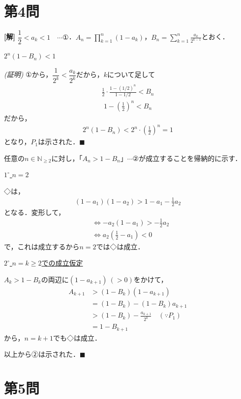 \documentclass[../main.tex]{subfiles}
\begin{document}
\newpage

\section*{第4問}

{\bf [解]}
$\dfrac12<a_k<1\quad\cdots①$．$A_n=\displaystyle\prod_{k=1}^n(1-a_k)$，$B_n=\displaystyle\sum_{k=1}^n\frac{a_k}{2^{k-1}}$とおく．

\bigskip
\noindent{\bf [補題$P_1$]} $2^n(1-B_n)<1$

\textit{(証明)} ①から，$\dfrac1{2^k}<\dfrac{a_k}{2^k}$だから，$k$について足して
\begin{align*}
  \frac12\cdot\frac{1-(1/2)^n}{1-1/2}<B_n
\end{align*}
\begin{align*}
  1-\left(\frac12\right)^n<B_n
\end{align*}
だから，
\begin{align*}
  2^n(1-B_n)<2^n\cdot\left(\frac12\right)^n=1
\end{align*}
となり，$P_1$は示された．$\blacksquare$

\bigskip
任意の$n\in\mathbb{N}_{\ge2}$に対し，「$A_n>1-B_n$」$\cdots②$が成立することを帰納的に示す．

\underline{$1^\circ$ $n=2$}

◇は，
\begin{align*}
  (1-a_1)(1-a_2)>1-a_1-\frac12a_2
\end{align*}
となる．変形して，
\begin{align*}
  &\iff-a_2(1-a_1)>-\frac12a_2\\
  &\iff a_2\left(\frac12-a_1\right)<0
\end{align*}
で，これは成立するから$n=2$では◇は成立．

\underline{$2^\circ$ $n=k\ge2$での成立仮定}

$A_k>1-B_k$の両辺に$(1-a_{k+1})\ (>0)$をかけて，
\begin{align*}
  A_{k+1}&>(1-B_k)(1-a_{k+1})\\
  &=(1-B_k)-(1-B_k)a_{k+1}\\
  &>(1-B_k)-\frac{a_{k+1}}{2^k}\quad(\because P_1)\\
  &=1-B_{k+1}
\end{align*}
から，$n=k+1$でも◇は成立．

以上から②は示された．$\blacksquare$

\newpage

\section*{第5問}
\end{document}
